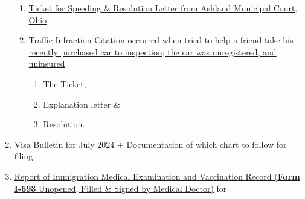 \begin{enumerate}[label=\textbf{ Exhibit-\arabic*}]
    \begin{enumerate}[label=\roman*.]
        \item \hyperref[exhibit13a]{Ticket for Speeding \& Resolution Letter from Ashland Municipal Court, Ohio}
        \item \hyperref[exhibit13b]{Traffic Infraction Citation occurred when tried to help a friend take his recently purchased car to inspection; the car was unregistered, and uninsured}\begin{enumerate}[label=\alph*.]
        \item The Ticket, 
        \item Explanation letter \& 
        \item Resolution.
        \end{enumerate}
        
        
    \end{enumerate}

    \item Visa Bulletin for July 2024 + Documentation of which chart to follow for filing
    \item \hyperref[exhibit14]{Report of Immigration Medical Examination and Vaccination Record (\textbf{Form I-693} Unopened, Filled \& Signed by Medical Doctor)} for \textit{\pApplicant}
\end{enumerate}